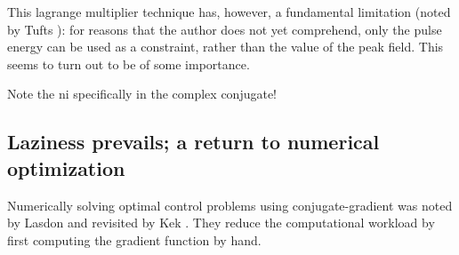 \documentclass[paper.tex]{subfiles}
\begin{document}
%
%
%
%
%
%
%
%
%
%




%
%
%
%
%
%

This lagrange multiplier technique has, however, a fundamental limitation (noted by Tufts \cite{Optimum1964}): for reasons that the author does not yet comprehend, only the pulse energy can be used as a constraint, rather than the value of the peak field. This seems to turn out to be of some importance.


Note the ni specifically in the complex conjugate!


\subsection{Laziness prevails; a return to numerical optimization}

Numerically solving optimal control problems using conjugate-gradient was noted by Lasdon \cite{conjugate1967} and 
revisited by Kek \cite{Conjugate}. They reduce the computational workload by first computing the 
gradient function by hand.
\end{document}
